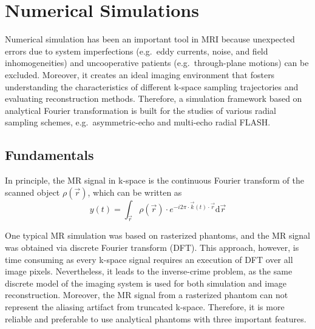 \chapter{Numerical Simulations} \label{Chp:sim}

Numerical simulation has been an important tool in \acs{MRI} because unexpected errors due to system imperfections (e.g.~eddy currents, noise, and field inhomogeneities) and uncooperative patients (e.g.~through-plane motions) can be excluded. Moreover, it creates an ideal imaging environment that fosters understanding the characteristics of different k-space sampling trajectories and evaluating reconstruction methods. Therefore, a simulation framework based on analytical Fourier transformation is built for the studies of various radial sampling schemes, e.g.~asymmetric-echo and multi-echo radial \acs{FLASH}.

\section{Fundamentals}
In principle, the MR signal in k-space is the continuous Fourier transform of the scanned object $\rho(\vec{r})$, which can be written as 
\begin{equation} \label{Equ:cont_FT_rho}
y(t) = \int_{\vec{r}} \rho(\vec{r}) \cdot e^{-i 2\pi \cdot \vec{k}(t) \cdot \vec{r}} \text{d} \vec{r}
\end{equation}

One typical MR simulation was based on rasterized phantoms, and the MR signal was obtained via discrete Fourier transform (\acs{DFT}). This approach, however, is time consuming as every k-space signal requires an execution of DFT over all image pixels. Nevertheless, it leads to the inverse-crime problem, as the same discrete model of the imaging system is used for both simulation and image reconstruction. Moreover, the MR signal from a rasterized phantom can not represent the aliasing artifact from truncated k-space. Therefore, it is more reliable and preferable to use analytical phantoms with three important features.


